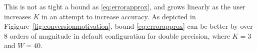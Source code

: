     This is not as tight a bound as \eqref{eq:errorapprox}, and grows linearly
    as the user increases $K$ in an attempt to increase accuracy.
    As depicted in Figigure~\ref{fig:conversionmotivation},
    bound \eqref{eq:errorapprox} can be better by over 8 orders of magnitude
    in default configuration for double precision, where $K=3$ and $W = 40$.

